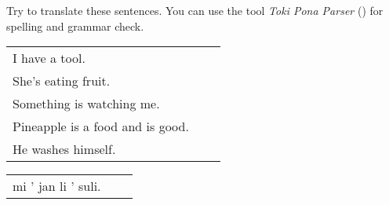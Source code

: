Try to translate these sentences.
You can use the tool \textit{Toki Pona Parser} (\cite{www:rowa:02}) for spelling and grammar check.

\begin{supertabular}{p{5,5cm}|ll}
    I have a tool.                   &  & \\ %
    She's eating fruit.              &  & \\ %
    Something is watching me.        &  & \\ %
    Pineapple is a food and is good. &  & \\ %
    He washes himself.               &  & \\ %
\end{supertabular}

\begin{supertabular}{p{5,5cm}|ll}
    mi ' jan li ' suli. &  & \\ %
\end{supertabular}

